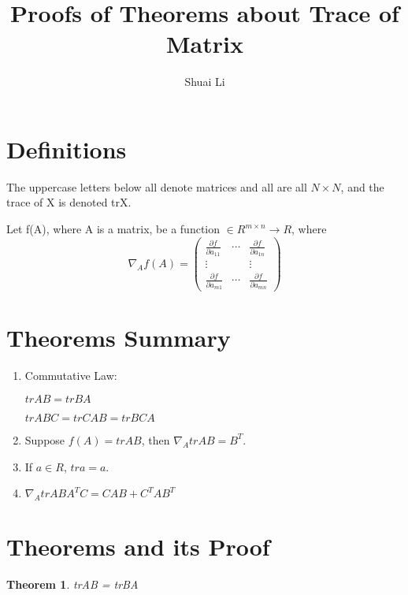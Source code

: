 \documentclass[a4paper]{article}
\title{Proofs of Theorems about Trace of Matrix}
\author{Shuai Li}
\newtheorem{theorem}{Theorem}[section]
\newenvironment{definition}[1][Definition]{\begin{trivlist}
\item[\hskip \labelsep {\bfseries #1}]}{\end{trivlist}}
\begin{document}
\maketitle
\tableofcontents
\pagebreak

\section{Definitions}

\begin{definition}
	The uppercase letters below all denote matrices and all are all
	$N\times N$, and the trace of X is denoted trX.
\end{definition}

\begin{definition}
	Let f(A), where A is a matrix, be a function $\in R^{m\times n} \to
	R $, where
	\begin{displaymath}
		\nabla_Af(A) =
		\begin{pmatrix}
			\frac{\partial f}{\partial a_{11}} & \cdots & \frac{\partial f}{\partial a_{1n}}\\
			\vdots &  & \vdots\\
			\frac{\partial f}{\partial a_{m1}} & \cdots & \frac{\partial f}{\partial a_{mn}}
		\end{pmatrix}
\end{displaymath}

\end{definition}

\section{Theorems Summary}
\begin{enumerate}
	\item Commutative Law:

		$trAB = trBA$  

		$trABC = trCAB = trBCA$
	\item Suppose $f(A) = trAB$, then $\nabla_A trAB = B^T$.
	\item If $a \in R$, $tra = a$.
	\item $\nabla_A trABA^TC = CAB + C^TAB^T$
\end{enumerate}



\section{Theorems and its Proof}

\begin{theorem}
	trAB = trBA
\end{theorem}
\end{document}
